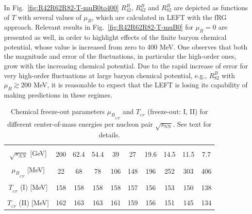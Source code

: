 \documentclass[%
reprint,
superscriptaddress,
showpacs,preprintnumbers,
 amsmath,amssymb,
 aps,
prd,
]{revtex4-1}
\def\Fig#1{Fig.~\ref{#1}} \def\Tab#1{Tab.~\ref{#1}}
\begin{document}
In \Fig{fig:R42R62R82-T-muB0to400} $R^{B}_{42}$, $R^{B}_{62}$ and $R^{B}_{82}$ are depicted as functions of $T$ with several values of $\mu_B$, which are calculated in LEFT with the fRG approach. Relevant results in \Fig{fig:R42R62R82-T-muB0} for $\mu_B=0$ are presented as well, in order to highlight effects of the finite baryon chemical potential, whose value is increased from zero to 400 MeV. One observes that both the magnitude and error of the fluctuations, in particular the high-order ones, grow with the increasing chemical potential. Due to the rapid increase of error for very high-order fluctuations at large baryon chemical potential, e.g., $R^{B}_{82}$ with $\mu_B\gtrsim 200$ MeV, it is reasonable to expect that the LEFT is losing its capability of making predictions in these regimes.

\begin{table}[t]
  \begin{center}
    \begin{tabular}{|c ||c|c|c|c|c|c|c|c|c|}
    \hline & & & & & & & & & \\[-2ex]
    \hline & & & & & & & & & \\[-1ex]
    $\sqrt{s_{NN}}$ [GeV] & 200 & 62.4 & 54.4 & 39 & 27 & 19.6 & 14.5 & 11.5 & 7.7\\[1ex]
    \hline & & & & & & & & & \\[-2ex]
    ${\mu_B}_{_{CF}}$ [MeV] & 22 & 68 & 78 & 106 & 148 & 196 & 252 & 303 & 406\\[1ex]
    \hline & & & & & & & & & \\[-2ex]
    $T_{_{CF}}$ (I) [MeV] &158 & 158 & 158 & 158 & 157 & 156 & 153 & 150 & 138\\[1ex]
    \hline & & & & & & & & & \\[-2ex]
    $T_{_{CF}}$ (II) [MeV] & 162 & 163 & 163 & 161 & 159 & 156 & 151 & 145 & 134\\[1ex]
    \hline
    \end{tabular}
    \caption{Chemical freeze-out parameters ${\mu_B}_{_{CF}}$ and $T_{_{CF}}$ (freeze-out: I, II) for different center-of-mass energies per nucleon pair $\sqrt{s_{\mathrm{NN}}}$. See text for details.}
    \label{tab:freeze-out-para}  
  \end{center}\vspace{-0.5cm}
\end{table}
\end{document}
